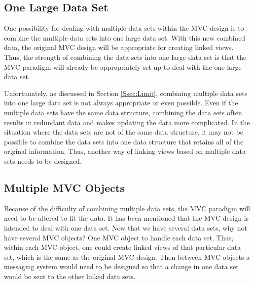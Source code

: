 \documentclass{article}[11pt]
\begin{document}
\subsection{One Large Data Set}\label{Ssec:OneDS}

One possibility for dealing with multiple data sets within the MVC design is to
combine the multiple data sets into one large data set.  With this new
combined data, the original MVC design will be appropriate for creating linked
views.  Thus, the strength of combining the data sets into one large data set
is that the MVC paradigm will already be appropriately set up to deal with the
one large data set. 

Unfortunately, as discussed in Section \ref{Ssec:Limit}, combining
multiple data sets into one large data set is not always appropriate or even
possible.  Even if the multiple data sets have the same data structure,
combining the data sets often results in redundant data and makes updating the
data more complicated.  In the situation where the data sets are not of the
same data structure, it may not be possible to combine the data sets into one
data structure that retains all of the original information.  Thus, another
way of linking views based on multiple data sets needs to be designed.

\subsection{Multiple MVC Objects}\label{Ssec:MMVC}

Because of the difficulty of combining multiple data sets, the MVC paradigm
will need to be altered to fit the data.  It has been mentioned that the MVC
design is intended to deal with one data set.  Now that we have several data
sets, why not have several MVC objects?  One MVC object to handle each data
set.  Thus, within each MVC object, one could create linked views of that
particular data set, which is the same as the original MVC design.  Then
between MVC objects a messaging system would need to be designed so that a
change in one data set would be sent to the other linked data sets.  
\end{document}
